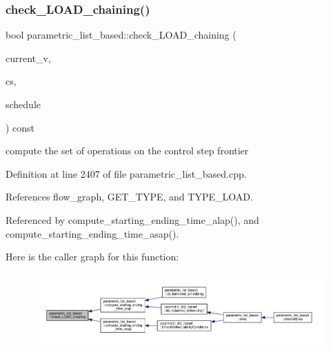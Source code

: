 \subsubsection{\texorpdfstring{check\+\_\+\+L\+O\+A\+D\+\_\+chaining()}{check\_LOAD\_chaining()}}
{\footnotesize\ttfamily bool parametric\+\_\+list\+\_\+based\+::check\+\_\+\+L\+O\+A\+D\+\_\+chaining (\begin{DoxyParamCaption}\item[{\hyperlink{graph_8hpp_abefdcf0544e601805af44eca032cca14}{vertex}}]{current\+\_\+v,  }\item[{const Control\+Step}]{cs,  }\item[{const \hyperlink{schedule_8hpp_a85e4dea8a1611026193d8ca13fc5a260}{Schedule\+Const\+Ref}}]{schedule }\end{DoxyParamCaption}) const\hspace{0.3cm}{\ttfamily [private]}}

compute the set of operations on the control step frontier 

Definition at line 2407 of file parametric\+\_\+list\+\_\+based.\+cpp.



References flow\+\_\+graph, G\+E\+T\+\_\+\+T\+Y\+PE, and T\+Y\+P\+E\+\_\+\+L\+O\+AD.



Referenced by compute\+\_\+starting\+\_\+ending\+\_\+time\+\_\+alap(), and compute\+\_\+starting\+\_\+ending\+\_\+time\+\_\+asap().

Here is the caller graph for this function\+:
\nopagebreak
\begin{figure}[H]
\begin{center}
\leavevmode
\includegraphics[width=350pt]{d7/d47/classparametric__list__based_a582b8b501406c0dbd5245d1db2aa34a7_icgraph}
\end{center}
\end{figure}
\mbox{\label{classparametric__list__based_a6457256257347530f45f19ca4b85b6bc}} 
